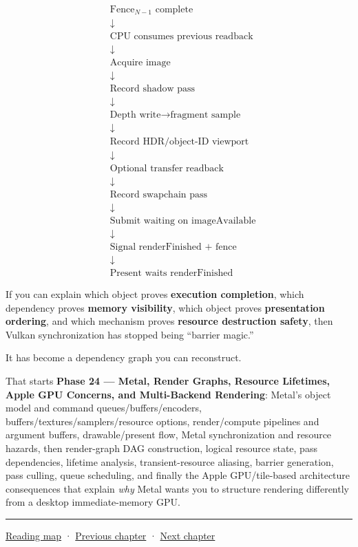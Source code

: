 \[
\boxed{
\begin{aligned}
&\text{Fence}_{N-1}\text{ complete}\\
&\downarrow\\
&\text{CPU consumes previous readback}\\
&\downarrow\\
&\text{Acquire image}\\
&\downarrow\\
&\text{Record shadow pass}\\
&\downarrow\\
&\text{Depth write}\rightarrow\text{fragment sample}\\
&\downarrow\\
&\text{Record HDR/object-ID viewport}\\
&\downarrow\\
&\text{Optional transfer readback}\\
&\downarrow\\
&\text{Record swapchain pass}\\
&\downarrow\\
&\text{Submit waiting on imageAvailable}\\
&\downarrow\\
&\text{Signal renderFinished + fence}\\
&\downarrow\\
&\text{Present waits renderFinished}
\end{aligned}
}
\]

If you can explain which object proves \textbf{execution completion}, which dependency proves \textbf{memory visibility}, which object proves \textbf{presentation ordering}, and which mechanism proves \textbf{resource destruction safety}, then Vulkan synchronization has stopped being ``barrier magic.''

It has become a dependency graph you can reconstruct.

That starts \textbf{Phase 24 --- Metal, Render Graphs, Resource Lifetimes, Apple GPU Concerns, and Multi-Backend Rendering}: Metal's object model and command queues/buffers/encoders, buffers/textures/samplers/resource options, render/compute pipelines and argument buffers, drawable/present flow, Metal synchronization and resource hazards, then render-graph DAG construction, logical resource state, pass dependencies, lifetime analysis, transient-resource aliasing, barrier generation, pass culling, queue scheduling, and finally the Apple GPU/tile-based architecture consequences that explain \emph{why} Metal wants you to structure rendering differently from a desktop immediate-memory GPU.

\begin{center}\rule{0.5\linewidth}{0.5pt}\end{center}

\href{Chapter\%20Edition/01\%20-\%20Computing\%20Foundations/00\%20-\%20Reading\%20Map}{Reading map} · \hyperref[01-foundations-i-ch013]{Previous chapter} · \hyperref[01-foundations-i-ch015]{Next chapter}
